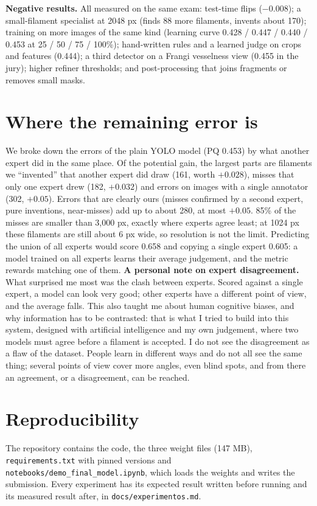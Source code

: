 \documentclass[conference]{IEEEtran}
\begin{document}
\textbf{Negative results.} All measured on the same exam: test-time flips ($-0.008$); a small-filament
specialist at 2048 px (finds 88 more filaments, invents about 170); training on more images of the same kind
(learning curve 0.428 / 0.447 / 0.440 / 0.453 at 25 / 50 / 75 / 100\%); hand-written rules and a learned
judge on crops and features (0.444); a third detector on a Frangi vesselness view (0.455 in the jury);
higher refiner thresholds; and post-processing that joins fragments or removes small masks.

\section{Where the remaining error is}
We broke down the errors of the plain YOLO model (PQ 0.453) by what another expert did in the same place.
Of the potential gain, the largest parts are filaments we ``invented'' that another expert did draw (161,
worth $+0.028$), misses that only one expert drew (182, $+0.032$) and errors on images with a single
annotator (302, $+0.05$). Errors that are clearly ours (misses confirmed by a second expert, pure inventions,
near-misses) add up to about 280, at most $+0.05$. 85\% of the misses are smaller than 3{,}000 px, exactly
where experts agree least; at 1024 px these filaments are still about 6 px wide, so resolution is not the
limit. Predicting the union of all experts would score 0.658 and copying a single expert 0.605: a model
trained on all experts learns their average judgement, and the metric rewards matching one of them.
\textbf{A personal note on expert disagreement.} What surprised me most was the clash between experts.
Scored against a single expert, a model can look very good; other experts have a different point of view,
and the average falls. This also taught me about human cognitive biases, and why information has to be
contrasted: that is what I tried to build into this system, designed with artificial intelligence and my
own judgement, where two models must agree before a filament is accepted. I do not see the disagreement as a
flaw of the dataset. People learn in different ways and do not all see the same thing; several points of
view cover more angles, even blind spots, and from there an agreement, or a disagreement, can be reached.

\section{Reproducibility}
The repository contains the code, the three weight files (147 MB), \texttt{requirements.txt} with pinned
versions and \texttt{notebooks/demo\_final\_model.ipynb}, which loads the weights and writes the submission.
Every experiment has its expected result written before running and its measured result after, in
\texttt{docs/experimentos.md}.
\end{document}
